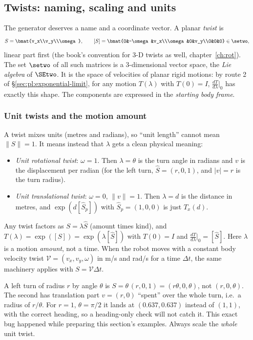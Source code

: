 \subsection{Twists: naming, scaling and units}\label{sec:pl:twists}

The generator deserves a name and a coordinate vector. A planar \emph{twist} is
\[
S=\bmat{v_x\\v_y\\\omega},\qquad [S]=\bmat{0&-\omega&v_x\\\omega&0&v_y\\0&0&0}\in\setwo,
\]
linear part first (the book's convention for 3-D twists as well, chapter~\ref{ch:rot}). The set $\setwo$ of all such matrices is a 3-dimensional vector space, the \emph{Lie algebra} of $\SEtwo$. It is the space of velocities of planar rigid motions: by route 2 of \S\ref{sec:pl:exponential-limit}, for any motion $T(\lambda)$ with $T(0)=I$, $\frac{dT}{d\lambda}\big|_0$ has exactly this shape. The components are expressed in the \emph{starting body frame}.

\subsubsection{Unit twists and the motion amount}
A twist mixes units (metres and radians), so ``unit length'' cannot mean $\|S\|=1$. It means instead that $\lambda$ gets a clean physical meaning:
\begin{itemize}
\item \emph{Unit rotational twist}: $\omega=1$. Then $\lambda=\theta$ is the turn angle in radians and $v$ is the displacement per radian (for the left turn, $\hat S=(r,0,1)$, and $|v|=r$ is the turn radius).
\item \emph{Unit translational twist}: $\omega=0$, $\|v\|=1$. Then $\lambda=d$ is the distance in metres, and $\exp(d[\hat S_p])$ with $\hat S_p=(1,0,0)$ is just $T_x(d)$.
\end{itemize}
Any twist factors as $S=\lambda\hat S$ (amount times kind), and $T(\lambda)=\exp([S])=\exp(\lambda[\hat S])$ with $T(0)=I$ and $\frac{dT}{d\lambda}\big|_0=[\hat S]$. Here $\lambda$ is a motion \emph{amount}, not a time. When the robot moves with a constant body velocity twist $\mathcal V=(v_x,v_y,\omega)$ in m/s and rad/s for a time $\Delta t$, the same machinery applies with $S=\mathcal V\Delta t$.

\begin{pitfall}
A left turn of radius $r$ by angle $\theta$ is $S=\theta\,(r,0,1)=(r\theta,0,\theta)$, not $(r,0,\theta)$. The second has translation part $v=(r,0)$ ``spent'' over the whole turn, i.e.\ a radius of $r/\theta$. For $r=1$, $\theta=\pi/2$ it lands at $(0.637,0.637)$ instead of $(1,1)$, with the correct heading, so a heading-only check will not catch it. This exact bug happened while preparing this section's examples. Always scale the \emph{whole} unit twist.
\end{pitfall}

